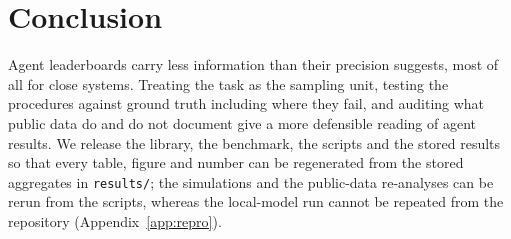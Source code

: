 \section{Conclusion}
Agent leaderboards carry less information than their precision suggests, most of all for close systems. Treating the task as the sampling unit, testing the procedures against ground truth including where they fail, and auditing what public data do and do not document give a more defensible reading of agent results. We release the library, the benchmark, the scripts and the stored results so that every table, figure and number can be regenerated from the stored aggregates in \texttt{results/}; the simulations and the public-data re-analyses can be rerun from the scripts, whereas the local-model run cannot be repeated from the repository (Appendix~\ref{app:repro}).
